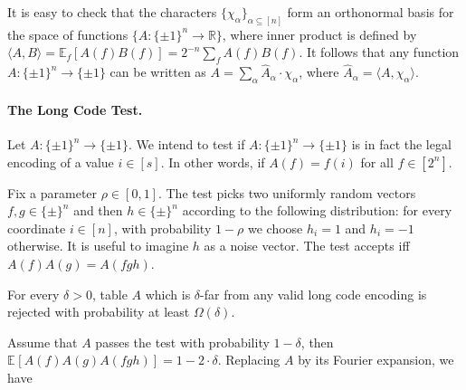 It is easy to check that the characters $\{\chi_\alpha\}_{\alpha
  \subseteq [n]}$ form an orthonormal basis for the space of functions
$\{A : \{\pm 1\}^n \rightarrow \mathbb{R}\}$, where inner product is
defined by $\langle A, B \rangle = \mathbb{E}_f[A(f) B(f)] =
2^{-n}\sum_fA(f)B(f)$. It follows that any function $A: \{\pm 1\}^n
\rightarrow \{\pm 1\}$ can be written as $A = \sum_\alpha
\hat{A}_\alpha \cdot \chi_\alpha$, where $\hat{A}_\alpha =\langle
A,\chi_\alpha \rangle$.

\paragraph{The Long Code Test.}\label{LC} Let $A : \{ \pm 1\}^n \rightarrow \{\pm 1\}$. 
We intend to test if $A : \{\pm 1\}^n \rightarrow \{\pm 1\}$ is in
fact the legal encoding of a value $i \in [s]$. In other words, if
$A(f) = f(i)$ for all $f \in [2^n]$.

Fix a parameter $\rho \in [0,1]$. The test picks two uniformly random
vectors $f,g \in \{\pm\}^n$ and then ${h} \in \{\pm\}^n$ according to the
following distribution: for every coordinate $i \in [n]$, with
probability $1 - \rho$ we choose $h_i = 1$ and $h_i = -1$ otherwise.
It is useful to imagine ${h}$ as a noise vector. The test accepts iff
$A({f}) A({g}) = A({fgh})$.
\newcommand{\E}[2]{{\mathbb{E}}_{#1}\left[#2\right]}

\begin{lemma}\label{longcode}
  For every $\delta > 0$, table $A$ which is $\delta$-far from any
  valid long code encoding is rejected with probability at least
  $\Omega(\delta)$.
\end{lemma}
  Assume that $A$ passes the test with
probability $1 - \delta$, then $\E{}{A(f)A(g)A(fgh)} = 1 -
2\cdot\delta$. Replacing $A$ by its Fourier expansion, we have


